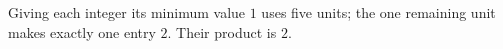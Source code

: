 Giving each integer its minimum value $ 1 $ uses five units; the one remaining unit makes exactly one entry $ 2 $. Their product is $\boxed2 $.
